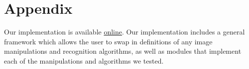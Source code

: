 \documentclass[pageno]{cos429}
\begin{document}


 
\section{Appendix}\label{sec:Appendix}
Our implementation is available \href{https://github.com/cchen23/COS429_final_project}{online}. Our implementation includes a general framework which allows the user to swap in definitions of any image manipulations and recognition algorithms, as well as modules that implement each of the manipulations and algorithms we tested.

\end{document}
